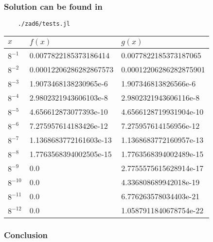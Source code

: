 \documentclass[12pt]{article}
\begin{document}
\subsubsection*{Solution can be found in}
\begin{verbatim}
    ./zad6/tests.jl
\end{verbatim}
\begin{table}[!ht]
    \centering
    \begin{tabular}{|l|l|l|}
    \hline
    $x$ & $f(x)$ & $g(x)$ \\ \hline
    $8^{-1}$ & 0.0077822185373186414 & 0.0077822185373187065 \\ \hline
    $8^{-2}$ & 0.00012206286282867573 & 0.00012206286282875901 \\ \hline
    $8^{-3}$ & 1.9073468138230965e-6 & 1.907346813826566e-6 \\ \hline
    $8^{-4}$ & 2.9802321943606103e-8 & 2.9802321943606116e-8 \\ \hline
    $8^{-5}$ & 4.656612873077393e-10 & 4.6566128719931904e-10 \\ \hline
    $8^{-6}$ & 7.275957614183426e-12 & 7.275957614156956e-12 \\ \hline
    $8^{-7}$ & 1.1368683772161603e-13 & 1.1368683772160957e-13 \\ \hline
    $8^{-8}$ & 1.7763568394002505e-15 & 1.7763568394002489e-15 \\ \hline
    $8^{-9}$ & 0.0 & 2.7755575615628914e-17 \\ \hline
    $8^{-10}$ & 0.0 & 4.336808689942018e-19 \\ \hline
    $8^{-11}$ & 0.0 & 6.776263578034403e-21 \\ \hline
    $8^{-12}$ & 0.0 & 1.0587911840678754e-22 \\ \hline
    \end{tabular}
\end{table}
\subsubsection*{Conclusion}
\end{document}
